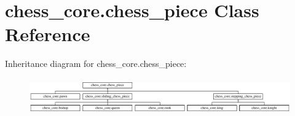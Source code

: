 \hypertarget{classchess__core_1_1chess__piece}{}\section{chess\+\_\+core.\+chess\+\_\+piece Class Reference}
\label{classchess__core_1_1chess__piece}
Inheritance diagram for chess\+\_\+core.\+chess\+\_\+piece\+:\begin{figure}[H]
\begin{center}
\leavevmode
\includegraphics[height=1.562791cm]{classchess__core_1_1chess__piece}
\end{center}
\end{figure}
